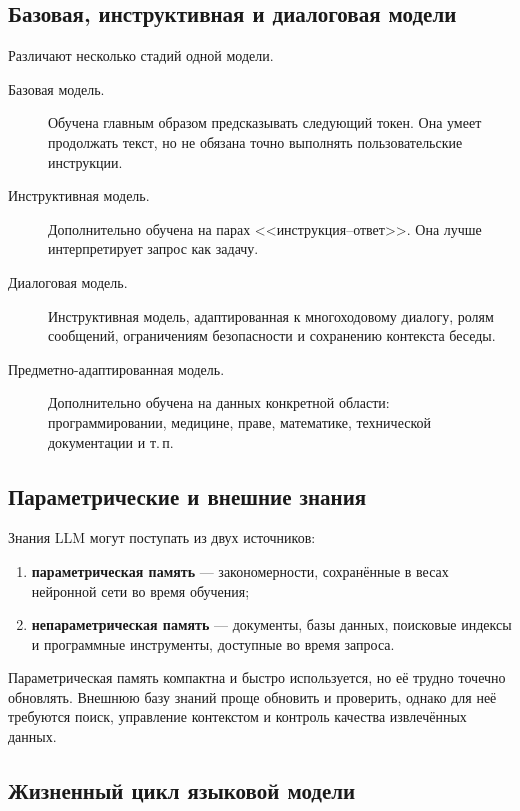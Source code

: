 \documentclass[12pt,a4paper]{article}
\newcommand{\1}{\mathbf{1}}
\theoremstyle{definition}
\theoremstyle{remark}
\begin{document}
\subsection{Базовая, инструктивная и диалоговая модели}

Различают несколько стадий одной модели.

\begin{description}
    \item[Базовая модель.] Обучена главным образом предсказывать следующий
    токен. Она умеет продолжать текст, но не обязана точно выполнять
    пользовательские инструкции.

    \item[Инструктивная модель.] Дополнительно обучена на парах
    <<инструкция--ответ>>. Она лучше интерпретирует запрос как задачу.

    \item[Диалоговая модель.] Инструктивная модель, адаптированная к
    многоходовому диалогу, ролям сообщений, ограничениям безопасности
    и сохранению контекста беседы.

    \item[Предметно-адаптированная модель.] Дополнительно обучена на данных
    конкретной области: программировании, медицине, праве, математике,
    технической документации и т.\,п.
\end{description}

\subsection{Параметрические и внешние знания}

Знания LLM могут поступать из двух источников:

\begin{enumerate}
    \item \textbf{параметрическая память} --- закономерности, сохранённые
    в весах нейронной сети во время обучения;
    \item \textbf{непараметрическая память} --- документы, базы данных,
    поисковые индексы и программные инструменты, доступные во время запроса.
\end{enumerate}

Параметрическая память компактна и быстро используется, но её трудно
точечно обновлять. Внешнюю базу знаний проще обновить и проверить, однако
для неё требуются поиск, управление контекстом и контроль качества
извлечённых данных.

\subsection{Жизненный цикл языковой модели}
\end{document}
